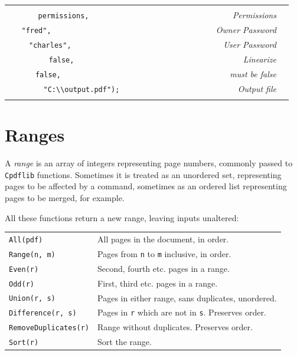 \documentclass[a4paper]{memoir}
\begin{document}
\begin{framed}
\begin{tabular}{rl}
\begin{minipage}{4in}
\begin{tabbing}
\small\verb!   Pdfwrite.encryption_method.NewAES128bit(false),  !\>\textit{Encryption}\\
\small\verb!   permissions,                                  !\>\textit{Permissions}\\
\small\verb!   "fred",                                       !\>\textit{Owner Password}\\
\small\verb!   "charles",                                    !\>\textit{User Password}\\
\small\verb!   false,                                        !\>\textit{Linearize}\\
\small\verb!   false,                                        !\>\textit{must be false}\\
\small\verb!   "C:\\output.pdf");                            !\>\textit{Output file}\\
\end{tabbing}
\end{minipage}
\end{tabular}
\end{framed}

\section{Ranges}

A \textit{range} is an array of integers representing page numbers, commonly
passed to \texttt{Cpdflib} functions. Sometimes it is treated as an unordered
set, representing pages to be affected by a command, sometimes as an ordered
list representing pages to be merged, for example.

All these functions return a new range, leaving inputs unaltered:

\begin{framed}
\begin{tabular}{ll}
\verb!All(pdf)! & All pages in the document, in order.\\
\verb!Range(n, m)! & Pages from \verb!n! to \verb!m! inclusive, in order.\\
\verb!Even(r)! & Second, fourth etc. pages in a range.\\
\verb!Odd(r)! & First, third etc. pages in a range.\\
\verb!Union(r, s)! & Pages in either range, sans duplicates, unordered.\\
\verb!Difference(r, s)! & Pages in \verb!r! which are not in \verb!s!. Preserves order.\\
\verb!RemoveDuplicates(r)! & Range without duplicates. Preserves order.\\
\verb!Sort(r)! & Sort the range.
\end{tabular}
\end{framed}
\end{document}
